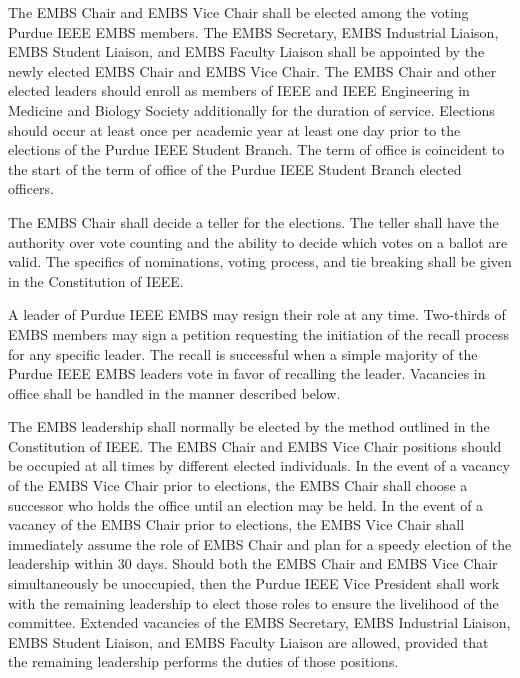 \documentclass[12pt]{constitution}
\begin{document}
\label{art:electdepart}

The EMBS Chair and EMBS Vice Chair shall be elected among the voting Purdue IEEE EMBS members. The EMBS Secretary, EMBS Industrial Liaison, EMBS Student Liaison, and EMBS Faculty Liaison shall be appointed by the newly elected EMBS Chair and EMBS Vice Chair.  The EMBS Chair and other elected leaders should enroll as members of IEEE and IEEE Engineering in Medicine and Biology Society additionally for the duration of service. Elections should occur at least once per academic year at least one day prior to the elections of the Purdue IEEE Student Branch. The term of office is coincident to the start of the term of office of the Purdue IEEE Student Branch elected officers.

The EMBS Chair shall decide a teller for the elections. The teller shall have the authority over vote counting and the ability to decide which votes on a ballot are valid. The specifics of nominations, voting process, and tie breaking shall be given in the Constitution of IEEE.

A leader of Purdue IEEE EMBS may resign their role at any time. Two-thirds of EMBS members may sign a petition requesting the initiation of the recall process for any specific leader. The recall is successful when a simple majority of the Purdue IEEE EMBS leaders vote in favor of recalling the leader. Vacancies in office shall be handled in the manner described below.

The EMBS leadership shall normally be elected by the method outlined in the Constitution of IEEE. The EMBS Chair and EMBS Vice Chair positions should be occupied at all times by different elected individuals. In the event of a vacancy of the EMBS Vice Chair prior to elections, the EMBS Chair shall choose a successor who holds the office until an election may be held. In the event of a vacancy of the EMBS Chair prior to elections, the EMBS Vice Chair shall immediately assume the role of EMBS Chair and plan for a speedy election of the leadership within 30 days. Should both the EMBS Chair and EMBS Vice Chair simultaneously be unoccupied, then the Purdue IEEE Vice President shall work with the remaining leadership to elect those roles to ensure the livelihood of the committee. Extended vacancies of the EMBS Secretary, EMBS Industrial Liaison, EMBS Student Liaison, and EMBS Faculty Liaison are allowed, provided that the remaining leadership performs the duties of those positions.
\end{document}
